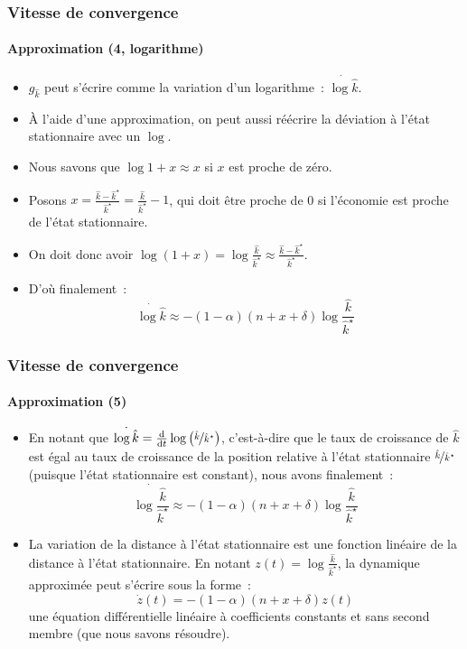 \documentclass[10pt,notheorems]{beamer}
\theoremstyle{plain}
\theoremstyle{definition} %
\begin{document}
\begin{frame}
  \frametitle{Vitesse de convergence}
  \framesubtitle{Approximation (4, logarithme)}

  \begin{itemize}

  \item $g_{\hat k}$ peut s'écrire comme la variation d'un logarithme~: $\dot{\log\hat k}$.\newline

  \item À l'aide d'une approximation, on peut aussi réécrire la déviation à l'état stationnaire avec un $\log$.\newline

  \item Nous savons que $\log 1+x \approx x$ si $x$ est proche de zéro.\newline

  \item Posons $x = \frac{\hat k - \hat k^{\star}}{\hat k^{\star}} = \frac{\hat k }{\hat k^{\star}}-1$, qui doit être proche de 0 si l'économie est proche de l'état stationnaire.\newline

  \item On doit donc avoir $\log(1+x) = \log \frac{\hat k }{\hat k^{\star}} \approx \frac{\hat k - \hat k^{\star}}{\hat k^\star}$.\newline

  \item D'où finalement~:
    \[
      \dot{\log\hat k} \approx -(1-\alpha)(n+x+\delta)\log\frac{\hat k }{\hat k^{\star}}
    \]

  \end{itemize}

\end{frame}


\begin{frame}
  \frametitle{Vitesse de convergence}
  \framesubtitle{Approximation (5)}

  \begin{itemize}

  \item En notant que $\dot{\log\hat k} = \frac{\mathrm d}{\mathrm dt}\log\left(\nicefrac{\hat k }{\hat k^{\star}}\right)$, c'est-à-dire que le taux de croissance de $\hat k$ est égal au taux de croissance de la position relative  à l'état stationnaire $\nicefrac{\hat k}{\hat k^{\star}}$ (puisque l'état stationnaire est constant), nous avons finalement~:
    \[
      \dot{\log\frac{\hat k }{\hat k^{\star}}} \approx -(1-\alpha)(n+x+\delta)\log\frac{\hat k }{\hat k^{\star}}
    \]

  \item La variation de la distance à l'état stationnaire est une fonction linéaire de la distance à l'état stationnaire. En notant $z(t) = \log\frac{\hat k }{\hat k^{\star}}$, la dynamique approximée peut s'écrire sous la forme~:
    \[
      \dot z(t) = -(1-\alpha)(n+x+\delta)z(t)
    \]
    une équation différentielle linéaire à coefficients constants et sans second membre (que nous savons résoudre).
  \end{itemize}

\end{frame}
\end{document}
